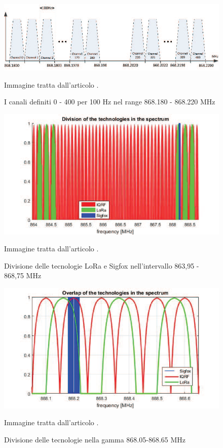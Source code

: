 \documentclass[a4paper]{report} %
\begin{document}
\begin{figure}
	\centering
	\includegraphics[scale=.5]{Immagini/DivisioneBande.png}
	
	\caption{I canali definiti 0 - 400 per 100 Hz nel range 868.180 - 868.220 MHz} %
	\label{fig:A}
	Immagine tratta dall'articolo \cite{art:rif.46}.
\end{figure}

\begin{figure}
	\centering
	\includegraphics[scale=.5]{Immagini/DivB.png}
	
	\caption{Divisione delle tecnologie LoRa e Sigfox nell'intervallo 863,95 - 868,75 MHz} %
	\label{fig:B}
	Immagine tratta dall'articolo \cite{art:rif.46}.
\end{figure}

\begin{figure}
	\centering
	\includegraphics[scale=.5]{Immagini/DivisioneBande2.png}
	
	\caption{Divisione delle tecnologie nella gamma 868.05-868.65 MHz} %
	\label{fig:C}
	Immagine tratta dall'articolo \cite{art:rif.46}.
\end{figure}
\end{document}
